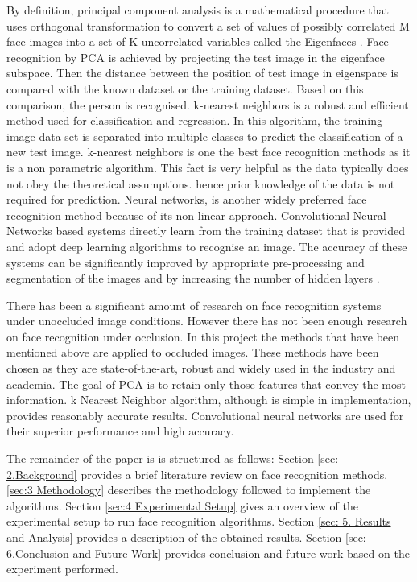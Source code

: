 \documentclass[conference]{IEEEtran}
\begin{document}
\vspace{0.5mm}
By definition, principal component analysis is a mathematical procedure that uses orthogonal transformation to convert a set of values of possibly correlated M face images into a set of K uncorrelated variables called the Eigenfaces
\cite{turk1991face}. Face recognition by PCA is achieved by projecting the test image in the eigenface subspace. Then the distance between the position of test image in eigenspace is compared with the known dataset or the training dataset. Based on this comparison, the person is recognised. k-nearest neighbors is a robust and efficient method used for classification and regression. In this algorithm, the training image data set is separated into multiple classes to predict the classification of a new test image. k-nearest neighbors is one the best face recognition methods as it is a non parametric algorithm. This fact is very helpful as the data typically does not obey the theoretical assumptions. hence prior knowledge of the data is not required for prediction. Neural networks, is another widely preferred face recognition method because of its non linear approach. Convolutional Neural Networks based systems directly learn from the training dataset that is provided and adopt deep learning algorithms to recognise an image. The accuracy of these systems can be significantly improved by appropriate pre-processing and segmentation of the images and by increasing the number of hidden layers \cite{dean2012large}.


There has been a significant amount of research on face recognition systems under unoccluded image conditions. However there has not been enough research on face recognition under occlusion. In this project the methods that have been mentioned above are applied to occluded images. These methods have been chosen as they are state-of-the-art, robust and widely used in the industry and academia. The goal of PCA is to retain only those features that convey the most information\cite{turk1991face}. k Nearest Neighbor algorithm, although is simple in implementation, provides reasonably accurate results\cite{zhang2007ml}. Convolutional neural networks are used for their superior performance and high accuracy\cite{lawrence1997face}.



The remainder of the paper is is structured as follows: Section \ref{sec: 2.Background} provides a brief literature review on face recognition methods. \ref{sec:3 Methodology} describes the methodology followed to implement the algorithms. Section \ref{sec:4 Experimental Setup} gives an overview of the experimental setup to run face recognition algorithms. Section \ref{sec: 5. Results and Analysis} provides a description of the obtained results. Section \ref{sec: 6.Conclusion and Future Work} provides conclusion and future work based on the experiment performed.
\end{document}
